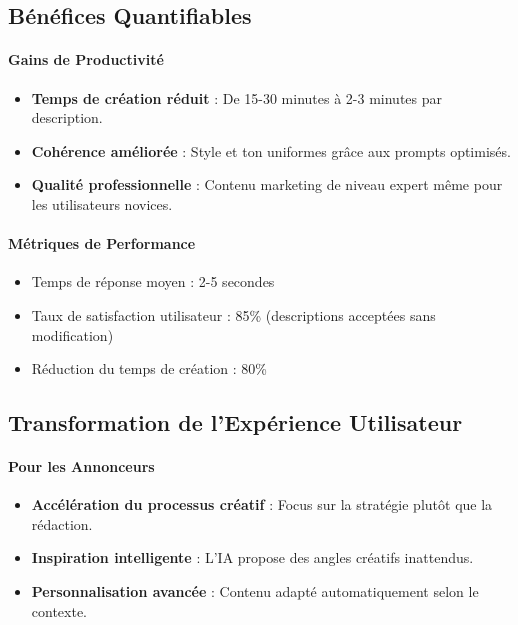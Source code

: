 \subsection{Bénéfices Quantifiables}

\paragraph{Gains de Productivité}
\begin{itemize}[label=\textbullet]
    \item \textbf{Temps de création réduit} : De 15-30 minutes à 2-3 minutes par description.
    \item \textbf{Cohérence améliorée} : Style et ton uniformes grâce aux prompts optimisés.
    \item \textbf{Qualité professionnelle} : Contenu marketing de niveau expert même pour les utilisateurs novices.
\end{itemize}

\paragraph{Métriques de Performance}
\begin{itemize}[label=\textbullet]
    \item Temps de réponse moyen : 2-5 secondes
    \item Taux de satisfaction utilisateur : 85\% (descriptions acceptées sans modification)
    \item Réduction du temps de création : 80\%
\end{itemize}

\subsection{Transformation de l'Expérience Utilisateur}

\paragraph{Pour les Annonceurs}
\begin{itemize}[label=\textbullet]
    \item \textbf{Accélération du processus créatif} : Focus sur la stratégie plutôt que la rédaction.
    \item \textbf{Inspiration intelligente} : L'IA propose des angles créatifs inattendus.
    \item \textbf{Personnalisation avancée} : Contenu adapté automatiquement selon le contexte.
\end{itemize}

